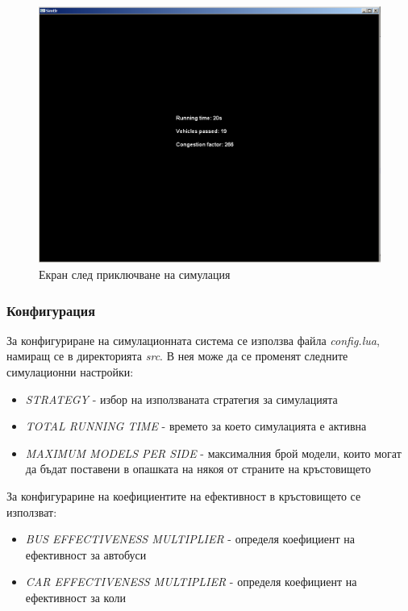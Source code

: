 	\begin{figure}[htb]
		\centering
		\includegraphics[scale=0.4]{assets/result.png}
		\caption{Екран след приключване на симулация}
		\label{fig:result-screen}
	\end{figure}	
	
	\subsubsection{Конфигурация}
	
		За конфигуриране на симулационната система се използва файла \emph{config.lua}, намиращ се в директорията \emph{src}.
		В нея може да се променят следните симулационни настройки:
		
		\begin{itemize}
			\item \emph{STRATEGY} - избор на използваната стратегия за симулацията
			\item \emph{TOTAL RUNNING TIME} - времето за което симулацията е активна
			\item \emph{MAXIMUM MODELS PER SIDE} - максималния брой модели, които могат да бъдат поставени в опашката на някоя
			от страните на кръстовището
		\end{itemize}
		
		За конфигурарине на коефициентите на ефективност в кръстовището се използват:
		
		\begin{itemize}
			\item \emph{BUS EFFECTIVENESS MULTIPLIER} - определя коефициент на ефективност за автобуси
			\item \emph{CAR EFFECTIVENESS MULTIPLIER} - определя коефициент на ефективност за коли
		\end{itemize}
		